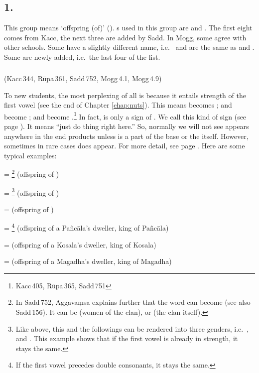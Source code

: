 \subsection*{1.\ }\label{tadgroup1}

This group means `offspring (of)' (). s used in this group are  and . The first eight comes from Kacc, the next three are added by Sadd. In Mogg, some agree with other schools. Some have a slightly different name, i.e.\  and  are the same as  and . Some are newly added, i.e.\ the last four of the list.

\subparagraph*{} (Kacc\,344, R\=upa\,361, Sadd\,752, Mogg\,4.1, Mogg\,4.9)\label{pacct1:dna}

To new students, the most perplexing  of all is  because it entails  strength of the first vowel (see the end of Chapter \ref{chap:nuts}). This means  becomes ;  and  become ;  and  become .\footnote{Kacc\,405, R\=upa\,365, Sadd\,751} In fact,  is only a sign of . We call this kind of sign  (see page \pageref{sec:anubandha}). It means ``just do  thing right here.'' So, normally we will not see  appears anywhere in the end products unless  is a part of the base or the  itself. However, sometimes in rare cases  does appear. For more detail, see page \pageref{par:dnapacc}. Here are some typical examples: 

 = \footnote{ In Sadd\,752, Aggava\d msa explains further that the word can become  (see also Sadd\,156). It can be  (women of the clan), or  (the clan itself).} (offspring of ) \par
{} = \footnote{Like above, this and the followings can be rendered into three genders, i.e.\ ,  and . This example shows that if the first vowel is already in  strength, it stays the same.} (offspring of )\par
{} =  (offspring of ) \par
{} = \footnote{If the first vowel precedes double consonants, it stays the same.} (offspring of a Pa\~nc\=ala's dweller, king of Pa\~nc\=ala) \par
{} =  (offspring of a Kosala's dweller, king of Kosala) \par
{} =  (offspring of a Magadha's dweller, king of Magadha) \par

